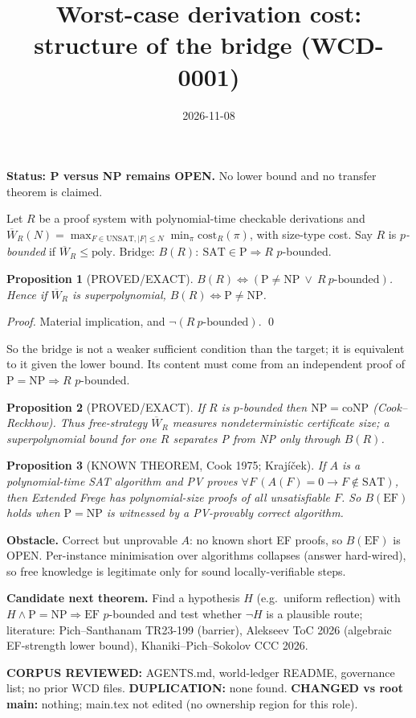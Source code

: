\documentclass{article}\usepackage{amsmath,amssymb,amsthm}
\title{Worst-case derivation cost: structure of the bridge (WCD-0001)}\date{2026-11-08}
\newtheorem{prop}{Proposition}
\begin{document}
\maketitle
\noindent\textbf{Status: P versus NP remains OPEN.} No lower bound and no transfer theorem is claimed.

Let $R$ be a proof system with polynomial-time checkable derivations and $\overline W_R(N)=\max_{F\in\mathrm{UNSAT},|F|\le N}\min_{\pi}\mathrm{cost}_R(\pi)$, with size-type cost. Say $R$ is \emph{$p$-bounded} if $\overline W_R\le\mathrm{poly}$. Bridge: $B(R):\ \mathrm{SAT}\in\mathrm P\Rightarrow R$ $p$-bounded.

\begin{prop}[PROVED/EXACT] $B(R)\iff(\mathrm P\ne\mathrm{NP}\ \lor\ R\ p\text{-bounded})$. Hence if $\overline W_R$ is superpolynomial, $B(R)\iff \mathrm P\ne\mathrm{NP}$.\end{prop}
\emph{Proof.} Material implication, and $\neg(R\ p\text{-bounded})$. \qed

So the bridge is not a weaker sufficient condition than the target; it is equivalent to it given the lower bound. Its content must come from an independent proof of $\mathrm P=\mathrm{NP}\Rightarrow R$ $p$-bounded.

\begin{prop}[PROVED/EXACT] If $R$ is $p$-bounded then $\mathrm{NP}=\mathrm{coNP}$ (Cook--Reckhow). Thus free-strategy $\overline W_R$ measures nondeterministic certificate size; a superpolynomial bound for one $R$ separates P from NP only through $B(R)$.\end{prop}

\begin{prop}[KNOWN THEOREM, Cook 1975; Krajíček] If $A$ is a polynomial-time SAT algorithm and PV proves $\forall F\,(A(F)=0\to F\notin\mathrm{SAT})$, then Extended Frege has polynomial-size proofs of all unsatisfiable $F$. So $B(\mathrm{EF})$ holds when $\mathrm P=\mathrm{NP}$ is witnessed by a PV-provably correct algorithm.\end{prop}

\textbf{Obstacle.} Correct but unprovable $A$: no known short EF proofs, so $B(\mathrm{EF})$ is OPEN. Per-instance minimisation over algorithms collapses (answer hard-wired), so free knowledge is legitimate only for sound locally-verifiable steps.

\textbf{Candidate next theorem.} Find a hypothesis $H$ (e.g.\ uniform reflection) with $H\wedge\mathrm P=\mathrm{NP}\Rightarrow\mathrm{EF}$ $p$-bounded and test whether $\neg H$ is a plausible route; literature: Pich--Santhanam TR23-199 (barrier), Alekseev ToC 2026 (algebraic EF-strength lower bound), Khaniki--Pich--Sokolov CCC 2026.

\textbf{CORPUS REVIEWED:} AGENTS.md, world-ledger README, governance list; no prior WCD files. \textbf{DUPLICATION:} none found. \textbf{CHANGED vs root main:} nothing; main.tex not edited (no ownership region for this role).
\end{document}
